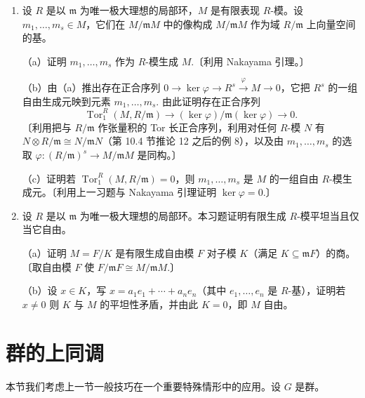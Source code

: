 \begin{enumerate}
（c）证明 \(A/\operatorname{image}g \cong B/\operatorname{image}f\) 并用它证明 \(A\) 有限生成。〔同构可由习题 3 中的蛇引理得到。然后证明 \(\operatorname{image}g\) 与 \(A/\operatorname{image}g\) 都有限生成，并应用第 10.3 节习题 7。〕

（d）若 \(I\) 是 \(R\) 的理想，证明 \(R/I\) 是有限表现 \(R\)-模当且仅当 \(I\) 是有限生成理想。

\item 设 \(R\) 是以 \(\mathfrak{m}\) 为唯一极大理想的局部环，\(M\) 是有限表现 \(R\)-模。设 \(m_1, \ldots, m_s \in M\)，它们在 \(M/\mathfrak{m}M\) 中的像构成 \(M/\mathfrak{m}M\) 作为域 \(R/\mathfrak{m}\) 上向量空间的基。

（a）证明 \(m_1, \ldots, m_s\) 作为 \(R\)-模生成 \(M\).〔利用 Nakayama 引理。〕

（b）由（a）推出存在正合序列 \(0 \to \ker\varphi \to R^s \xrightarrow{\varphi} M \to 0\)，它把 \(R^s\) 的一组自由生成元映到元素 \(m_1, \ldots, m_s\). 由此证明存在正合序列
\[
\operatorname{Tor}_1^R(M, R/\mathfrak{m}) \to (\ker\varphi)/\mathfrak{m}(\ker\varphi) \to 0.
\]
〔利用把与 \(R/\mathfrak{m}\) 作张量积的 Tor 长正合序列，利用对任何 \(R\)-模 \(N\) 有 \(N \otimes R/\mathfrak{m} \cong N/\mathfrak{m}N\)（第 10.4 节推论 12 之后的例 8），以及由 \(m_1, \ldots, m_s\) 的选取 \(\varphi : (R/\mathfrak{m})^s \to M/\mathfrak{m}M\) 是同构。〕

（c）证明若 \(\operatorname{Tor}_1^R(M, R/\mathfrak{m}) = 0\)，则 \(m_1, \ldots, m_s\) 是 \(M\) 的一组自由 \(R\)-模生成元。〔利用上一习题与 Nakayama 引理证明 \(\ker\varphi = 0\).〕

\item 设 \(R\) 是以 \(\mathfrak{m}\) 为唯一极大理想的局部环。本习题证明有限生成 \(R\)-模平坦当且仅当它自由。

（a）证明 \(M = F/K\) 是有限生成自由模 \(F\) 对子模 \(K\)（满足 \(K \subseteq \mathfrak{m}F\)）的商。〔取自由模 \(F\) 使 \(F/\mathfrak{m}F \cong M/\mathfrak{m}M\).〕

（b）设 \(x \in K\)，写 \(x = a_1e_1+\cdots+a_ne_n\)（其中 \(e_1, \ldots, e_n\) 是 \(R\)-基），证明若 \(x \neq 0\) 则 \(K\) 与 \(M\) 的平坦性矛盾，并由此 \(K = 0\)，即 \(M\) 自由。
\end{enumerate}
\section{群的上同调}

本节我们考虑上一节一般技巧在一个重要特殊情形中的应用。设 \(G\) 是群。

